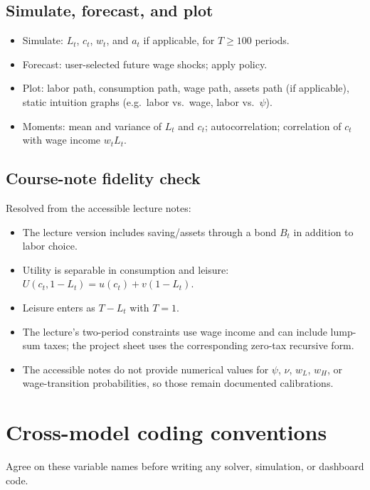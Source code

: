 \documentclass[11pt]{article}
\begin{document}
\subsection{Simulate, forecast, and plot}
\begin{itemize}
    \item Simulate: $L_t$, $c_t$, $w_t$, and $a_t$ if applicable, for $T \geq 100$ periods.
    \item Forecast: user-selected future wage shocks; apply policy.
    \item Plot: labor path, consumption path, wage path, assets path (if applicable), static intuition graphs (e.g.\ labor vs.\ wage, labor vs.\ $\psi$).
    \item Moments: mean and variance of $L_t$ and $c_t$; autocorrelation; correlation of $c_t$ with wage income $w_t L_t$.
\end{itemize}

\subsection{Course-note fidelity check}

\begin{warningbox}
Resolved from the accessible lecture notes:
\begin{itemize}
    \item The lecture version includes saving/assets through a bond $B_t$ in addition to labor choice.
    \item Utility is separable in consumption and leisure: $U(c_t,1-L_t)=u(c_t)+v(1-L_t)$.
    \item Leisure enters as $T-L_t$ with $T=1$.
    \item The lecture's two-period constraints use wage income and can include lump-sum taxes; the project sheet uses the corresponding zero-tax recursive form.
    \item The accessible notes do not provide numerical values for $\psi$, $\nu$, $w_L$, $w_H$, or wage-transition probabilities, so those remain documented calibrations.
\end{itemize}
\end{warningbox}

\bigskip
\section{Cross-model coding conventions}

Agree on these variable names before writing any solver, simulation, or dashboard code.
\end{document}
